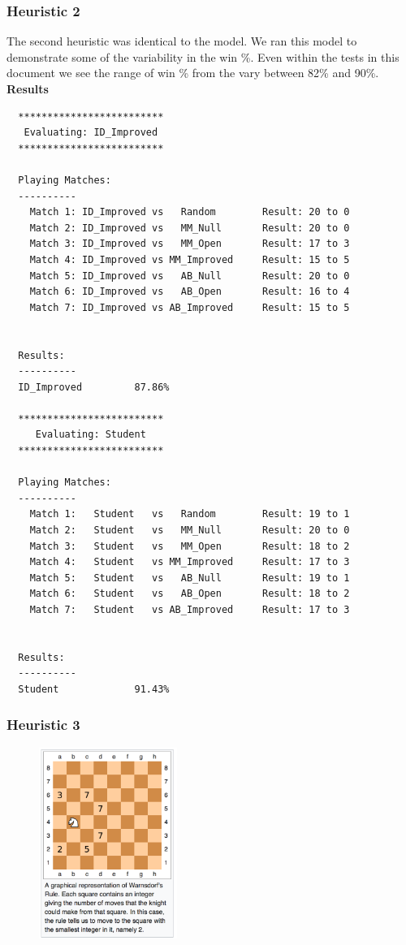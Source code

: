 \documentclass{article}
\begin{document}
\subsubsection{Heuristic 2}

The second heuristic was identical to the \texttt{} model. We ran this model to demonstrate
some of the variability in the win \%. Even within the tests in this document we see the range of win \% from the \texttt{}
vary between 82\% and 90\%.\newline
\textbf{Results}\newline
\begin{verbatim}
  *************************
   Evaluating: ID_Improved
  *************************

  Playing Matches:
  ----------
    Match 1: ID_Improved vs   Random    	Result: 20 to 0
    Match 2: ID_Improved vs   MM_Null   	Result: 20 to 0
    Match 3: ID_Improved vs   MM_Open   	Result: 17 to 3
    Match 4: ID_Improved vs MM_Improved 	Result: 15 to 5
    Match 5: ID_Improved vs   AB_Null   	Result: 20 to 0
    Match 6: ID_Improved vs   AB_Open   	Result: 16 to 4
    Match 7: ID_Improved vs AB_Improved 	Result: 15 to 5


  Results:
  ----------
  ID_Improved         87.86%

  *************************
     Evaluating: Student
  *************************

  Playing Matches:
  ----------
    Match 1:   Student   vs   Random    	Result: 19 to 1
    Match 2:   Student   vs   MM_Null   	Result: 20 to 0
    Match 3:   Student   vs   MM_Open   	Result: 18 to 2
    Match 4:   Student   vs MM_Improved 	Result: 17 to 3
    Match 5:   Student   vs   AB_Null   	Result: 19 to 1
    Match 6:   Student   vs   AB_Open   	Result: 18 to 2
    Match 7:   Student   vs AB_Improved 	Result: 17 to 3


  Results:
  ----------
  Student             91.43%
\end{verbatim}

\subsubsection{Heuristic 3}

\begin{figure}
    \centering
    \includegraphics[width=0.4\textwidth]{chessboard}
\end{figure}
\end{document}
